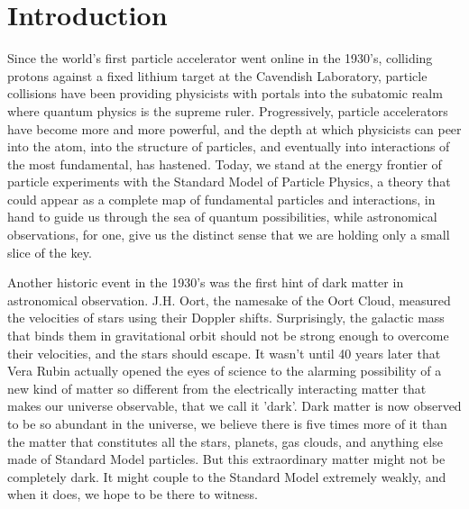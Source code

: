 \chapter{Introduction}

Since the world's first particle accelerator went online in the 1930's, colliding protons against a fixed lithium target at the Cavendish Laboratory, particle collisions have been providing physicists with portals into the subatomic realm where quantum physics is the supreme ruler.  Progressively, particle accelerators have become more and more powerful, and the depth at which physicists can peer into the atom, into the structure of particles, and eventually into interactions of the most fundamental, has hastened.  Today, we stand at the energy frontier of particle experiments with the Standard Model of Particle Physics, a theory that could appear as a complete map of fundamental particles and interactions, in hand to guide us through the sea of quantum possibilities, while astronomical observations, for one, give us the distinct sense that we are holding only a small slice of the key.  

Another historic event in the 1930's was the first hint of dark matter in astronomical observation.  J.H. Oort, the namesake of the Oort Cloud, measured the velocities of stars using their Doppler shifts.  Surprisingly, the galactic mass that binds them in gravitational orbit should not be strong enough to overcome their velocities, and the stars should escape.  It wasn't until 40 years later that Vera Rubin actually opened the eyes of science to the alarming possibility of a new kind of matter so different from the electrically interacting matter that makes our universe observable, that we call it 'dark'.  Dark matter is now observed to be so abundant in the universe, we believe there is five times more of it than the matter that constitutes all the stars, planets, gas clouds, and anything else made of Standard Model particles.  But this extraordinary matter might not be completely dark.  It might couple to the Standard Model extremely weakly, and when it does, we hope to be there to witness.

